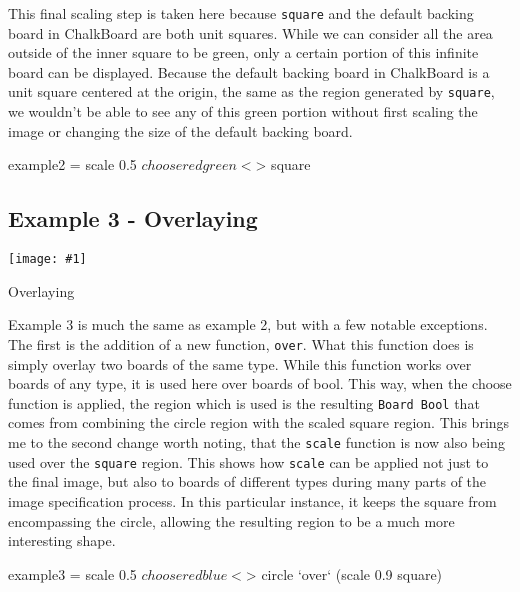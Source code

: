 \documentclass{article}
\newcommand{\floatimg}[3]{%
\begin{floatingfigure}[r]{0.35\textwidth} 
\texttt{[image: \#1]}
\caption{#2}\label{#3}
\end{floatingfigure}}
\begin{document}
This final scaling step is taken here because \texttt{square} and the
default backing board in ChalkBoard are both unit squares. While we can
consider all the area outside of the inner square to be green, only a
certain portion of this infinite board can be displayed. Because the
default backing board in ChalkBoard is a unit square centered at the
origin, the same as the region generated by \texttt{square}, we
wouldn't be able to see any of this green portion without first
scaling the image or changing the size of the default backing board.

\vspace{0.1in}

\begin{DSL}
example2 = scale 0.5 $ choose red green <$> square
\end{DSL}



\newpage
\subsection{Example 3 - Overlaying}

\floatimg{ex3.png}{Overlaying}{fig:ex3}%
Example 3 is much the same as example 2, but with a few notable
exceptions. The first is the addition of a new function,
\texttt{over}. What this function does is simply overlay two boards of
the same type. While this function works over boards of any type, it
is used here over boards of bool. This way, when the choose function
is applied, the region which is used is the resulting \texttt{Board Bool}
that comes from combining the circle region with the scaled
square region. This brings me to the second change worth noting,
that the \texttt{scale} function is now also being
used over the \texttt{square} region. This shows how \texttt{scale} can be
applied not just to the final image, but also to boards of different
types during many parts of the image specification process. In this
particular instance, it keeps the square from encompassing the circle,
allowing the resulting region to be a much more interesting shape.

\vspace{0.1in}

\begin{DSL}
example3 = scale 0.5 $ choose red blue <$> circle
                                           `over`
                                           (scale 0.9 square)
\end{DSL}
\end{document}
